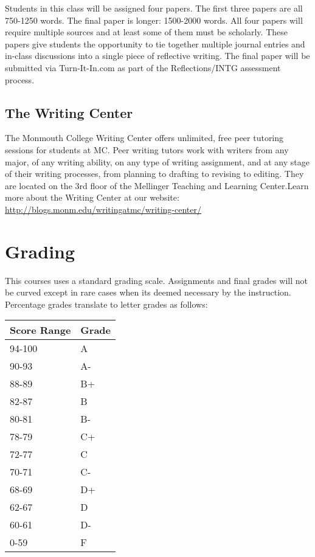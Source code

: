 \documentclass[]{tufte-handout}
\begin{document}
Students in this class will be  assigned four papers. The first three papers are all 750-1250 words. The final paper is longer: 1500-2000 words. All four papers will require multiple sources and at least some of them must be scholarly. These papers give students the opportunity to tie together multiple journal entries and in-class discussions into a single piece of reflective writing. The final paper will be submitted via Turn-It-In.com as part of the Reflections/INTG assessment process. 

\subsection{The Writing Center}

The Monmouth College Writing Center offers unlimited, free peer tutoring sessions for students at MC.  Peer writing tutors work with writers from any major, of any writing ability, on any type of writing assignment, and at any stage of their writing processes, from planning to drafting to revising to editing.  They are located on the 3rd floor of the Mellinger Teaching and Learning Center.Learn more about the Writing Center at our website: \url{http://blogs.monm.edu/writingatmc/writing-center/}

\section{Grading}

This courses uses a standard grading scale.  Assignments and final grades will not be curved except in rare cases when its deemed necessary by the instruction.  Percentage grades translate to letter grades as follows:
\newline
\begin{center}
\begin{small}
\begin{tabular}{ll}
Score Range & Grade \\ \hline
94-100 & A \\
90-93 & A- \\
88-89 & B+ \\
82-87 & B \\
80-81 & B- \\
78-79 & C+ \\
72-77 & C \\
70-71 & C- \\
68-69 & D+ \\
62-67 & D \\
60-61 & D- \\
0-59 & F 
\end{tabular}
\end{small}
\end{center}
\end{document}
